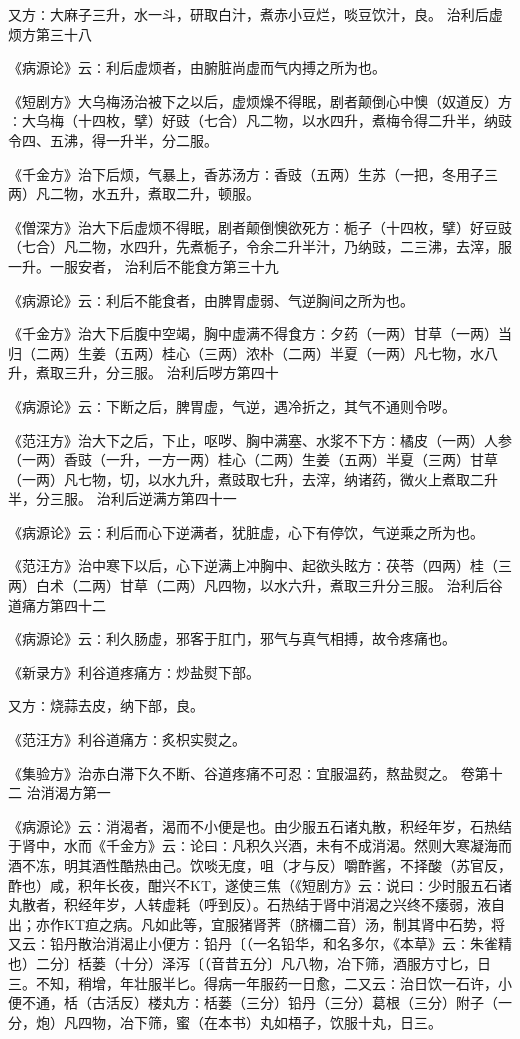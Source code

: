 \documentclass[a4paper,12pt,UTF8,twoside]{ctexbook}
\begin{document}
又方∶大麻子三升，水一斗，研取白汁，煮赤小豆烂，啖豆饮汁，良。
治利后虚烦方第三十八

《病源论》云∶利后虚烦者，由腑脏尚虚而气内搏之所为也。

《短剧方》大乌梅汤治被下之以后，虚烦燥不得眠，剧者颠倒心中懊（奴道反）方∶大乌梅（十四枚，擘）好豉（七合）凡二物，以水四升，煮梅令得二升半，纳豉令四、五沸，得一升半，分二服。

《千金方》治下后烦，气暴上，香苏汤方∶香豉（五两）生苏（一把，冬用子三两）凡二物，水五升，煮取二升，顿服。

《僧深方》治大下后虚烦不得眠，剧者颠倒懊欲死方∶栀子（十四枚，擘）好豆豉（七合）凡二物，水四升，先煮栀子，令余二升半汁，乃纳豉，二三沸，去滓，服一升。一服安者，
治利后不能食方第三十九

《病源论》云∶利后不能食者，由脾胃虚弱、气逆胸间之所为也。

《千金方》治大下后腹中空竭，胸中虚满不得食方∶夕药（一两）甘草（一两）当归（二两）生姜（五两）桂心（三两）浓朴（二两）半夏（一两）凡七物，水八升，煮取三升，分三服。
治利后哕方第四十

《病源论》云∶下断之后，脾胃虚，气逆，遇冷折之，其气不通则令哕。

《范汪方》治大下之后，下止，呕哕、胸中满塞、水浆不下方∶橘皮（一两）人参（一两）香豉（一升，一方一两）桂心（二两）生姜（五两）半夏（三两）甘草（一两）凡七物，切，以水九升，煮豉取七升，去滓，纳诸药，微火上煮取二升半，分三服。
治利后逆满方第四十一

《病源论》云∶利后而心下逆满者，犹脏虚，心下有停饮，气逆乘之所为也。

《范汪方》治中寒下以后，心下逆满上冲胸中、起欲头眩方∶茯苓（四两）桂（三两）白术（二两）甘草（二两）凡四物，以水六升，煮取三升分三服。
治利后谷道痛方第四十二

《病源论》云∶利久肠虚，邪客于肛门，邪气与真气相搏，故令疼痛也。

《新录方》利谷道疼痛方∶炒盐熨下部。

又方∶烧蒜去皮，纳下部，良。

《范汪方》利谷道痛方∶炙枳实熨之。

《集验方》治赤白滞下久不断、谷道疼痛不可忍∶宜服温药，熬盐熨之。
卷第十二
治消渴方第一

《病源论》云∶消渴者，渴而不小便是也。由少服五石诸丸散，积经年岁，石热结于肾中，水而《千金方》云∶论曰∶凡积久兴酒，未有不成消渴。然则大寒凝海而酒不冻，明其酒性酷热由己。饮啖无度，咀（才与反）嚼酢酱，不择酸（苏官反，酢也）咸，积年长夜，酣兴不KT，遂使三焦（《短剧方》云∶说曰∶少时服五石诸丸散者，积经年岁，人转虚耗（呼到反）。石热结于肾中消渴之兴终不痿弱，液自出；亦作KT疸之病。凡如此等，宜服猪肾荠（脐檷二音）汤，制其肾中石势，将又云∶铅丹散治消渴止小便方∶铅丹〔（一名铅华，和名多尔，《本草》云∶朱雀精也）二分〕栝蒌（十分）泽泻〔（音昔五分〕凡八物，冶下筛，酒服方寸匕，日三。不知，稍增，年壮服半匕。得病一年服药一日愈，二又云∶治日饮一石许，小便不通，栝（古活反）楼丸方∶栝蒌（三分）铅丹（三分）葛根（三分）附子（一分，炮）凡四物，冶下筛，蜜（在本书）丸如梧子，饮服十丸，日三。
\end{document}
